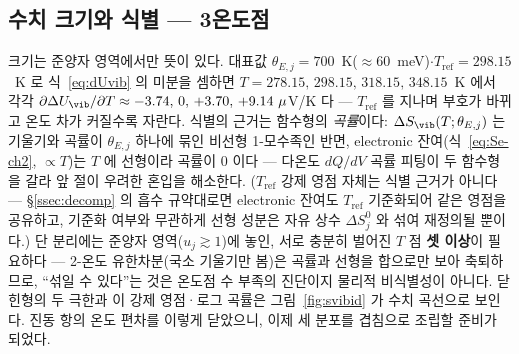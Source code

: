 \subsection{수치 크기와 식별 --- 3온도점}\label{ssec:einstein-numid}
크기는 준양자 영역에서만 뜻이 있다. 대표값 $\theta_{E,j}=700$~K($\approx60$~meV)$\cdot$$T_\mathrm{ref}=298.15$~K
로 식~\eqref{eq:dUvib} 의 미분을 셈하면 $T=278.15,\,298.15,\,318.15,\,348.15$~K 에서 각각 $\partial\Delta
U_\vib/\partial T\approx-3.74,\,0,\,+3.70,\,+9.14~\mu$V/K 다 --- $T_\mathrm{ref}$ 를 지나며 부호가 바뀌고 온도
차가 커질수록 자란다. 식별의 근거는 함수형의 \emph{곡률}이다: $\Delta S_\vib(T;\theta_{E,j})$ 는 기울기와
곡률이 $\theta_{E,j}$ 하나에 묶인 비선형 1-모수족인 반면, electronic 잔여(식~\eqref{eq:Se-ch2}, $\propto T$)는
$T$ 에 선형이라 곡률이 $0$ 이다 --- 다온도 $dQ/dV$ 곡률 피팅이 두 함수형을 갈라 앞 절이 우려한 혼입을
해소한다. ($T_\mathrm{ref}$ 강제 영점 자체는 식별 근거가 아니다 --- \S\ref{ssec:decomp} 의 흡수 규약대로면
electronic 잔여도 $T_\mathrm{ref}$ 기준화되어 같은 영점을 공유하고, 기준화 여부와 무관하게 선형 성분은 자유
상수 $\Delta S^0_j$ 와 섞여 재정의될 뿐이다.) 단 분리에는 준양자 영역($u_j\gtrsim1$)에 놓인, 서로 충분히 벌어진 $T$ 점
\textbf{셋 이상}이 필요하다 --- 2-온도 유한차분(국소 기울기만 봄)은 곡률과 선형을 합으로만 보아 축퇴하므로,
``섞일 수 있다''는 것은 온도점 수 부족의 진단이지 물리적 비식별성이 아니다. 닫힌형의 두 극한과 이 강제 영점·로그
곡률은 그림~\ref{fig:svibid} 가 수치 곡선으로 보인다. 진동 항의 온도 편차를 이렇게 닫았으니,
이제 세 분포를 겹침으로 조립할 준비가 되었다.

